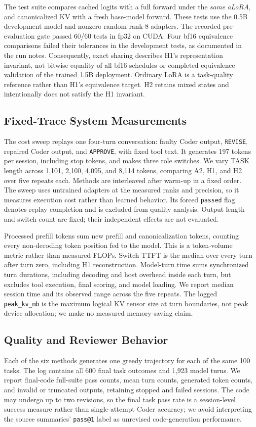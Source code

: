 \documentclass[10pt,twocolumn,letterpaper]{article}
\begin{document}
The test suite compares cached logits with a full forward under the
\emph{same aLoRA}, and canonicalized KV with a fresh base-model forward.
These tests use the 0.5B development model and nonzero random rank-8 adapters.
The recorded pre-evaluation gate passed 60/60 tests in fp32 on CUDA. Four bf16
equivalence comparisons failed their tolerances in the development tests,
as documented in the run notes. Consequently, exact sharing describes H1's
representation invariant, not bitwise equality of all bf16 schedules or
completed equivalence validation of the trained 1.5B deployment. Ordinary
LoRA is a task-quality reference rather than H1's equivalence target. H2
retains mixed states and intentionally does not satisfy the H1 invariant.

\subsection{Fixed-Trace System Measurements}
The cost sweep replays one four-turn conversation: faulty Coder output,
\texttt{REVISE}, repaired Coder output, and \texttt{APPROVE}, with fixed tool
text. It generates 197 tokens per session, including stop tokens, and makes
three role switches. We vary TASK length across 1,101, 2,100, 4,095, and 8,114
tokens, comparing A2, H1, and H2 over five repeats each. Methods are
interleaved after warm-up in a fixed order. The sweep uses untrained adapters
at the measured ranks and precision, so it measures execution cost rather
than learned behavior. Its forced \texttt{passed} flag denotes replay
completion and is excluded from quality analysis. Output length and switch
count are fixed; their independent effects are not evaluated.

Processed prefill tokens sum new prefill and canonicalization tokens, counting
every non-decoding token position fed to the model. This is a token-volume
metric rather than measured FLOPs. Switch TTFT is the median over every turn
after turn zero, including H1 reconstruction. Model-turn time sums synchronized
turn durations, including decoding and host overhead inside each turn, but
excludes tool execution, final scoring, and model loading. We report median
session time and its observed range across the five repeats. The logged
\texttt{peak\_kv\_mb} is the maximum logical KV tensor size at turn boundaries,
not peak device allocation; we make no measured memory-saving claim.

\subsection{Quality and Reviewer Behavior}
Each of the six methods generates one greedy trajectory for each of the same
100 tasks. The log contains all 600 final task outcomes and 1,923 model turns.
We report final-code full-suite pass counts, mean turn counts, generated token
counts, and invalid or truncated outputs, retaining stopped and failed
sessions. The code may undergo up to two revisions, so the final task pass
rate is a session-level success measure rather than single-attempt Coder
accuracy; we avoid interpreting the source summaries' \texttt{pass@1} label
as unrevised code-generation performance.
\end{document}
